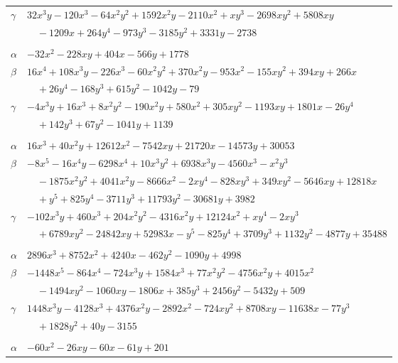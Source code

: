 \documentclass[11pt]{article}
\begin{document}
\begin{longtable}{@{}ll@{}}
$\gamma$ & $32x^{3}y-120x^{3}-64x^{2}y^{2}+1592x^{2}y-2110x^{2}+xy^{3}-2698xy^{2}+5808xy$\\
 & $\quad -1209x+264y^{4}-973y^{3}-3185y^{2}+3331y-2738$\\
\addlinespace[3pt]
\multicolumn{2}{@{}l}{$\{i,j\}=\{4,93\}$, $k_{ij}=2^{2}\cdot 3\cdot 7^{3}$}\\
$\alpha$ & $-32x^{2}-228xy+404x-566y+1778$\\
$\beta$ & $16x^{4}+108x^{3}y-226x^{3}-60x^{2}y^{2}+370x^{2}y-953x^{2}-155xy^{2}+394xy+266x$\\
 & $\quad +26y^{4}-168y^{3}+615y^{2}-1042y-79$\\
$\gamma$ & $-4x^{3}y+16x^{3}+8x^{2}y^{2}-190x^{2}y+580x^{2}+305xy^{2}-1193xy+1801x-26y^{4}$\\
 & $\quad +142y^{3}+67y^{2}-1041y+1139$\\
\addlinespace[3pt]
\multicolumn{2}{@{}l}{$\{i,j\}=\{4,132\}$, $k_{ij}=3^{2}\cdot 7^{3}\cdot 19$}\\
$\alpha$ & $16x^{3}+40x^{2}y+12612x^{2}-7542xy+21720x-14573y+30053$\\
$\beta$ & $-8x^{5}-16x^{4}y-6298x^{4}+10x^{3}y^{2}+6938x^{3}y-4560x^{3}-x^{2}y^{3}$\\
 & $\quad -1875x^{2}y^{2}+4041x^{2}y-8666x^{2}-2xy^{4}-828xy^{3}+349xy^{2}-5646xy+12818x$\\
 & $\quad +y^{5}+825y^{4}-3711y^{3}+11793y^{2}-30681y+3982$\\
$\gamma$ & $-102x^{3}y+460x^{3}+204x^{2}y^{2}-4316x^{2}y+12124x^{2}+xy^{4}-2xy^{3}$\\
 & $\quad +6789xy^{2}-24842xy+52983x-y^{5}-825y^{4}+3709y^{3}+1132y^{2}-4877y+35488$\\
\addlinespace[3pt]
\multicolumn{2}{@{}l}{$\{i,j\}=\{4,147\}$, $k_{ij}=2^{2}\cdot 3^{2}\cdot 7^{3}$}\\
$\alpha$ & $2896x^{3}+8752x^{2}+4240x-462y^{2}-1090y+4998$\\
$\beta$ & $-1448x^{5}-864x^{4}-724x^{3}y+1584x^{3}+77x^{2}y^{2}-4756x^{2}y+4015x^{2}$\\
 & $\quad -1494xy^{2}-1060xy-1806x+385y^{3}+2456y^{2}-5432y+509$\\
$\gamma$ & $1448x^{3}y-4128x^{3}+4376x^{2}y-2892x^{2}-724xy^{2}+8708xy-11638x-77y^{3}$\\
 & $\quad +1828y^{2}+40y-3155$\\
\addlinespace[3pt]
\multicolumn{2}{@{}l}{$\{i,j\}=\{4,148\}$, $k_{ij}=3^{4}\cdot 7$}\\
$\alpha$ & $-60x^{2}-26xy-60x-61y+201$\\

\end{longtable}
\end{document}

